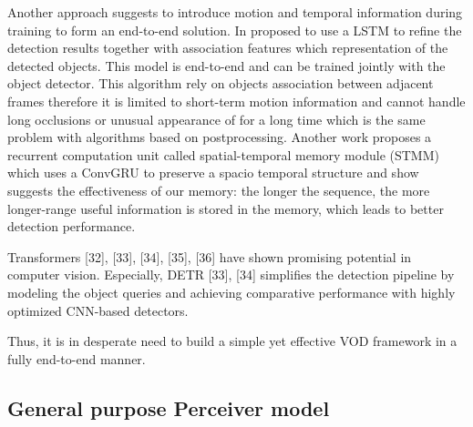 

Another approach suggests to introduce motion and temporal information during training to form an end-to-end solution. In \cite{Lu_2017_ICCV} proposed to use a LSTM \cite{6795963} to refine the detection results together with association features which representation of the detected objects. This model is end-to-end and can be trained jointly with the object detector. This algorithm rely on objects association between adjacent frames therefore it is limited to short-term motion information and cannot handle long occlusions or unusual appearance of for a long time which is the same problem with algorithms based on postprocessing. Another work proposes a recurrent computation unit called spatial-temporal memory module (STMM) \cite{xiaoVideoObjectDetection2018} which uses a ConvGRU \cite{ballasDelvingDeeperConvolutional2016} to preserve a spacio temporal structure and show suggests the effectiveness of our memory: the longer the sequence, the more longer-range useful information is stored in the memory, which leads to better detection performance.


Transformers [32], [33], [34], [35], [36] have shown promising potential in computer vision. Especially, DETR [33], [34] simplifies the detection pipeline by modeling the object queries and achieving comparative performance with highly optimized CNN-based detectors.

Thus, it is in desperate need to build a simple yet effective VOD framework in a fully end-to-end manner.

\subsection{General purpose Perceiver model} \label{Background:VideoObjectDetection}